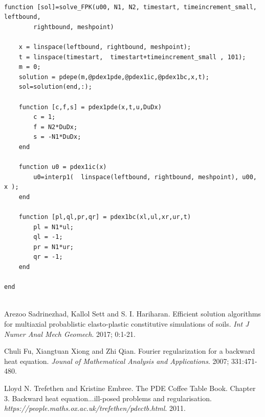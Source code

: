 \documentclass[12pt]{article}
\begin{document}
\begin{lstlisting}

function [sol]=solve_FPK(u00, N1, N2, timestart, timeincrement_small, leftbound,
 		rightbound, meshpoint)

    x = linspace(leftbound, rightbound, meshpoint);
    t = linspace(timestart,  timestart+timeincrement_small , 101);
    m = 0;
    solution = pdepe(m,@pdex1pde,@pdex1ic,@pdex1bc,x,t);
    sol=solution(end,:);

    function [c,f,s] = pdex1pde(x,t,u,DuDx)
        c = 1;
        f = N2*DuDx;
        s = -N1*DuDx;
    end

    function u0 = pdex1ic(x)
        u0=interp1(  linspace(leftbound, rightbound, meshpoint), u00, x );
    end

    function [pl,ql,pr,qr] = pdex1bc(xl,ul,xr,ur,t)
        pl = N1*ul;
        ql = -1;
        pr = N1*ur;
        qr = -1;
    end

end


\end{lstlisting}

\begin{thebibliography}{9}
Arezoo Sadrinezhad, Kallol Sett and S. I. Hariharan. 
Efficient solution algorithms for multiaxial probablistic elasto-plastic constitutive simulations of soils.
\textit{Int J Numer Anal Mech Geomech}. 
2017; 0:1-21.
 
Chuli Fu, Xiangtuan Xiong and Zhi Qian. 
Fourier regularization for a backward heat equation.
\textit{Jounal of Mathematical Analysis and Applications}. 
2007; 331:471-480.

Lloyd N. Trefethen and Kristine Embree. 
The PDE Coffee Table Book. Chapter 3. Backward heat equation...ill-posed problems and regularisation.
\textit{https://people.maths.ox.ac.uk/trefethen/pdectb.html}. 
2011.

\end{thebibliography}
\end{document}
